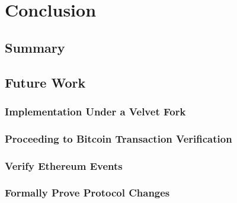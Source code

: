 \chapter{Conclusion}
\section{Summary}
\section{Future Work}
\subsection{Implementation Under a Velvet Fork}
\subsection{Proceeding to Bitcoin Transaction Verification}
\subsection{Verify Ethereum Events}
\subsection{Formally Prove Protocol Changes}
